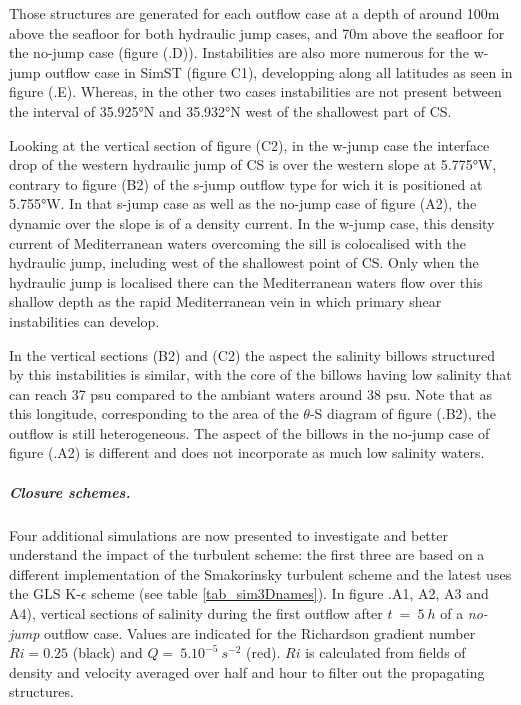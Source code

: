 Those structures are generated for each outflow case at a depth of around 100m above the seafloor for both hydraulic jump cases, and 70m above the seafloor for the no-jump case (figure (.D)). Instabilities are also more numerous for the w-jump outflow case in SimST (figure C1), developping along all latitudes as seen in figure (.E). Whereas, in the other two cases instabilities are not present between the interval of 35.925°N and 35.932°N west of the shallowest part of CS.

Looking at the vertical section of figure (C2), in the w-jump case the interface drop of the western hydraulic jump of CS is over the western slope at 5.775°W, contrary to figure (B2) of the s-jump outflow type for wich it is positioned at 5.755°W. In that s-jump case as well as the no-jump case of figure (A2), the dynamic over the slope is of a density current. In the w-jump case, this density current of Mediterranean waters overcoming the sill is colocalised with the hydraulic jump, including west of the shallowest point of CS. Only when the hydraulic jump is localised there can the Mediterranean waters flow over this shallow depth as the rapid Mediterranean vein in which primary shear instabilities can develop. 

In the vertical sections (B2) and (C2) the aspect the salinity billows structured by this instabilities is similar, with the core of the billows having low salinity that can reach 37 psu compared to the ambiant waters around 38 psu. Note that as this longitude, corresponding to the area of the $\theta$-S diagram of figure (.B2), the outflow is still heterogeneous. The aspect of the billows in the no-jump case of figure (.A2) is different and does not incorporate as much low salinity waters.




\subparagraph{Closure schemes.}

Four additional simulations are now presented to investigate and better understand the impact of the turbulent scheme: the first three are based on a different implementation of the Smakorinsky turbulent scheme and the latest uses the GLS K-$\epsilon$ scheme (see table \ref{tab_sim3Dnames}). 
In figure .A1, A2, A3 and A4), vertical sections of salinity during the first outflow after $t\ =\ 5\ h$ of a \textit{no-jump} outflow case. Values are indicated for the Richardson gradient number $Ri=0.25$ (black) and $Q =\ 5.10^{-5} \ s^{-2}$ (red). $Ri$ is calculated from fields of density and velocity averaged over half and hour to filter out the propagating structures.

